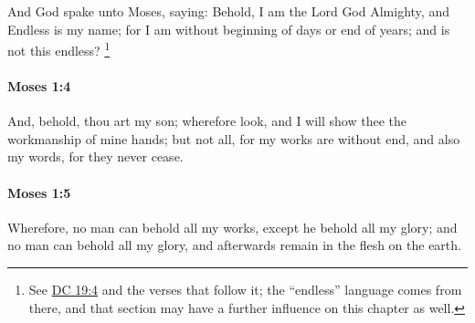 			And God spake unto Moses, saying: Behold, I am the Lord God Almighty, and Endless is my name; for I am without beginning of days or end of years; and is not this endless?%
				\footnote{%
					\label{MOSES-1-3-NOTE-endless}%
					See \hyperref[DC19-4]{DC 19:4} and the verses that follow it; the ``endless'' language comes from there, and that section may have a further influence on this chapter as well.
					}
					
					
		\paragraph{Moses 1:4} %
			\label{MOSES-1-4}

			And, behold, thou art my son; wherefore look, and I will show thee the workmanship of mine hands; but not all, for my works are without end, and also my words, for they never cease.


		\paragraph{Moses 1:5} %
			\label{MOSES-1-5}

			Wherefore, no man can behold all my works, except he behold all my glory; and no man can behold all my glory, and afterwards remain in the flesh on the earth.



